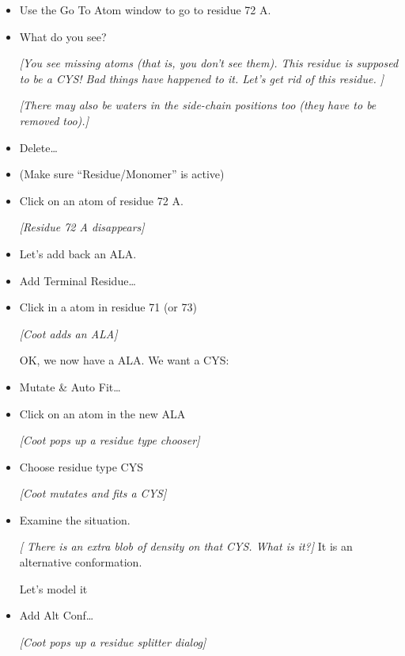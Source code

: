 \documentclass{article}
\begin{document}
\begin{itemize}
\item Use the Go To Atom window to go to residue 72 A.

\item What do you see?

  \emph{[You see missing atoms (that is, you don't see them).  This residue
  is supposed to be a CYS!  Bad things have happened to it.  Let's get
  rid of this residue. ]}

\emph{[There may also be waters in the side-chain positions too (they have
  to be removed too).]}

\item \textsf{Delete\ldots}

\item (Make sure ``Residue/Monomer'' is active)

\item Click on an atom of residue 72 A.

\textsl{  [Residue 72 A disappears]}

\item Let's add back an ALA.

\item \textsf{Add Terminal Residue\ldots}

\item Click in a atom in residue 71 (or 73)

\textsl{  [\emph{Coot} adds an ALA]}

OK, we now have a ALA.  We want a CYS:

\item \textsf{Mutate \& Auto Fit\ldots}

\item Click on an atom in the new ALA

\textsl{  [\emph{Coot} pops up a residue type chooser]}

\item Choose residue type \textsf{CYS}

\textsl{  [\emph{Coot} mutates and fits a CYS]}

\item Examine the situation.

\emph{[ There is an extra blob of density on that CYS.  What is it?]}
It is an alternative conformation.

Let's model it

\item \textsf{Add Alt Conf\ldots}

\textsl{  [\emph{Coot} pops up a residue splitter dialog]}


\end{itemize}
\end{document}
